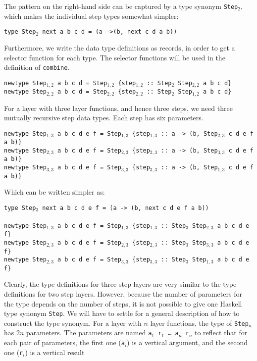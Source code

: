 The pattern on the right-hand side can be captured by a type synonym \texttt{Step$_2$}, which makes the individual step types somewhat simpler:

{\tt type Step$_2$ next a b c d = (a ->(b, next c d a b))}

Furthermore, we write the data type definitions as records, in order to get a selector function for each type. The selector functions will be used in the definition of \texttt{combine}.

{\tt newtype Step$_{1,2}$ a b c d = Step$_{1,2}$ \{step$_{1,2}$}\verb| :: |{\tt Step$_2$ Step$_{2,2}$  a b c d\}}\\
{\tt newtype Step$_{2,2}$ a b c d = Step$_{2,2}$ \{step$_{2,2}$}\verb| :: |{\tt Step$_2$ Step$_{1,2}$  a b c d\}}


For a layer with three layer functions, and hence three steps, we need three mutually recursive step data types. Each step has six parameters.

{\tt newtype Step$_{1,3}$ a b c d e f = Step$_{1,3}$ \{step$_{1,3}$}\verb| :: |{\tt a -> (b, Step$_{2,3}$ c d e f a b)\}}\\
{\tt newtype Step$_{2,3}$ a b c d e f = Step$_{2,3}$ \{step$_{2,3}$}\verb| :: |{\tt a -> (b, Step$_{3,3}$ c d e f a b)\}}\\
{\tt newtype Step$_{3,3}$ a b c d e f = Step$_{3,3}$ \{step$_{3,3}$}\verb| :: |{\tt a -> (b, Step$_{1,3}$ c d e f a b)\}}

Which can be written simpler as:

{\tt type Step$_3$ next a b c d e f = (a -> (b, next c d e f a b))}\\
\\
{\tt newtype Step$_{1,3}$ a b c d e f = Step$_{1,3}$ \{step$_{1,3}$}\verb| :: |{\tt Step$_3$ Step$_{2,3}$ a b c d e f\} }\\
{\tt newtype Step$_{2,3}$ a b c d e f = Step$_{2,3}$ \{step$_{2,3}$}\verb| :: |{\tt Step$_3$ Step$_{3,3}$ a b c d e f\} }\\
{\tt newtype Step$_{2,3}$ a b c d e f = Step$_{3,3}$ \{step$_{3,3}$}\verb| :: |{\tt Step$_3$ Step$_{1,3}$ a b c d e f\} }

Clearly, the type definitions for three step layers are very similar to the type definitions for two step layers. However, because the number of parameters for the type depends on the number of steps, it is not possible to give one Haskell type synonym \texttt{Step}. We will have to settle for a general description of how to construct the type synonym. For a layer with $n$ layer functions, the type of \texttt{Step$_n$} has $2n$ parameters. The parameters are named \texttt{a$_1$ r$_1$ \dots ~a$_n$ r$_n$} to reflect that for each pair of parameters, the first one (\texttt{a$_i$}) is a vertical argument, and the second one (\texttt{r$_i$}) is a vertical result 

